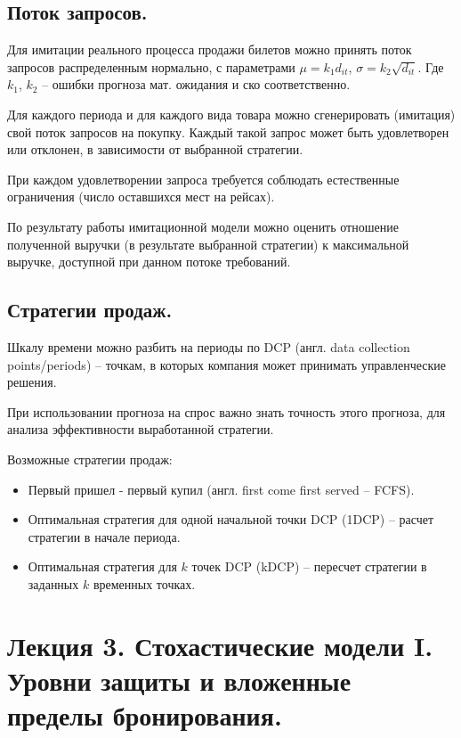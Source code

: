 \documentclass[reqno]{article}
\theoremstyle{definition}
\theoremstyle{definition}
\theoremstyle{definition}
\theoremstyle{definition}
\theoremstyle{definition}
\theoremstyle{definition}
\theoremstyle{definition}
\theoremstyle{definition}
\theoremstyle{definition}
\begin{document}
		
		\subsection{Поток запросов.}
		
		
		Для имитации реального процесса продажи билетов можно принять поток запросов распределенным нормально, с параметрами $\mu = k_1 d_{i t}$, $\sigma = k_2 \sqrt{d_{i t}}$. Где $k_1$, $k_2$ -- ошибки прогноза мат. ожидания и ско соответственно.
		
		Для каждого периода и для каждого вида товара можно сгенерировать (имитация) свой поток запросов на покупку. Каждый такой запрос может быть удовлетворен или отклонен, в зависимости от выбранной стратегии.
		
		При каждом удовлетворении запроса требуется соблюдать естественные ограничения (число оставшихся мест на рейсах).
		
		По результату работы имитационной модели можно оценить отношение полученной выручки (в результате выбранной стратегии) к максимальной выручке, доступной при данном потоке требований.
		
		
		\subsection{Стратегии продаж.}
		
		Шкалу времени можно разбить на периоды по DCP (англ. data collection points/periods) -- точкам, в которых компания может принимать управленческие решения.
		
		При использовании прогноза на спрос важно знать точность этого прогноза, для анализа эффективности выработанной стратегии.
		
		Возможные стратегии продаж:
		\begin{itemize}
			\item Первый пришел - первый купил (англ. first come first served -- FCFS).
			\item Оптимальная стратегия для одной начальной точки DCP (1DCP) -- расчет стратегии в начале периода.
			\item Оптимальная стратегия для $k$ точек DCP (kDCP) -- пересчет стратегии в заданных $k$ временных точках.
		\end{itemize}
	
			
		
		
		\newpage
		\section{Лекция 3. Стохастические модели I. Уровни защиты и вложенные пределы бронирования.}
		
\end{document}
